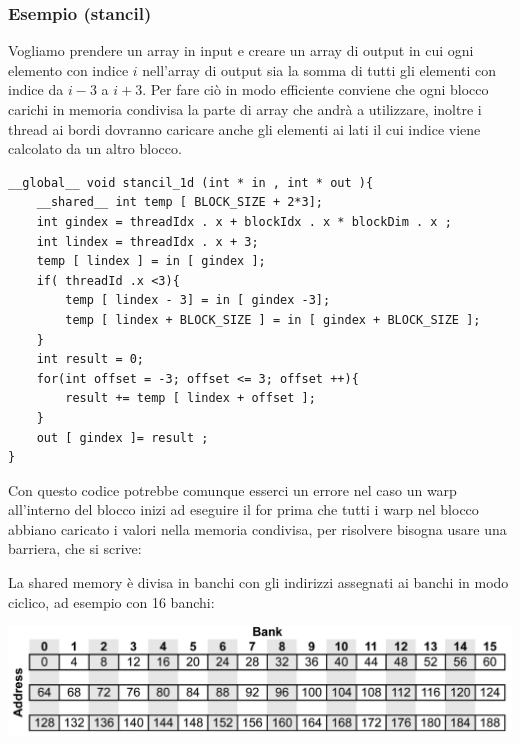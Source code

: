\documentclass[10pt, letterpaper]{report}
\begin{document}
\subsubsection{Esempio (stancil)}
Vogliamo prendere un array in input e creare un array di output in cui ogni elemento con indice
$i$ nell'array di output sia la somma di tutti gli elementi con indice da $i-3$ a $i + 3$. Per fare ciò
in modo efficiente conviene che ogni blocco carichi in memoria condivisa la parte di array che
andrà a utilizzare, inoltre i thread ai bordi dovranno caricare anche gli elementi ai lati il cui
indice viene calcolato da un altro blocco.
\begin{lstlisting}[style=CStyle]
__global__ void stancil_1d (int * in , int * out ){
    __shared__ int temp [ BLOCK_SIZE + 2*3];
    int gindex = threadIdx . x + blockIdx . x * blockDim . x ;
    int lindex = threadIdx . x + 3;
    temp [ lindex ] = in [ gindex ];
    if( threadId .x <3){
        temp [ lindex - 3] = in [ gindex -3];
        temp [ lindex + BLOCK_SIZE ] = in [ gindex + BLOCK_SIZE ];
    }
    int result = 0;
    for(int offset = -3; offset <= 3; offset ++){
        result += temp [ lindex + offset ];
    }
    out [ gindex ]= result ;
}
    \end{lstlisting}
    Con questo codice potrebbe comunque esserci un errore nel caso un warp all'interno del blocco
inizi ad eseguire il for prima che tutti i warp nel blocco abbiano caricato i valori nella memoria
condivisa, per risolvere bisogna usare una barriera, che si scrive:\begin{center}
\end{center}
La shared memory è divisa in banchi con gli indirizzi assegnati ai banchi in modo ciclico, ad
esempio con 16 banchi:\begin{center}
    \includegraphics[width=1\textwidth ]{images/banco.png}\end{center}
\end{document}
